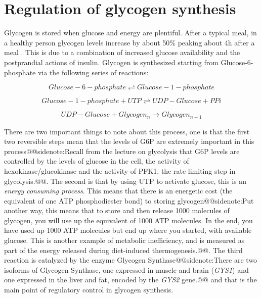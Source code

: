 \documentclass{tufte-handout}
\makeatletter
\def\sidenote#1{@@sidenote:#1@@}
\makeatother
\begin{document}
\section{Regulation of glycogen synthesis}

Glycogen is stored when glucose and energy are plentiful.  After a typical meal, in a healthy person glycogen levels increase by about 50\% peaking about 4h after a meal \citep{Taylor1996a}.  This is due to a combination of increased glucose availability and the postprandial actions of insulin.  Glycogen is synthesized starting from Glucose-6-phosphate via the following series of reactions:

\begin{equation}
Glucose-6-phosphate \rightleftharpoons Glucose-1-phosphate
\end{equation}

\begin{equation}
Glucose-1-phosphate + UTP \rightleftharpoons UDP-Glucose + PPi
\end{equation}

\begin{equation}
UDP-Glucose + Glycogen_n \rightarrow Glycogen_{n+1}
\end{equation}

There are two important things to note about this process, one is that the first two reversible steps mean that the levels of G6P are extremely important in this process\sidenote{Recall from the lecture on glycolysis that G6P levels are controlled by the levels of glucose in the cell, the activity of hexokinase/glucokinase and the activity of PFK1, the rate limiting step in glycolysis.}.  The second is that by using UTP to activate glucose, this is an \emph{energy consuming process}.  This means that there is an energetic cost (the equivalent of one ATP phosphodiester bond) to storing glycogen\sidenote{Put another way, this means that to store and then release 1000 molecules of glycogen, you will use up the equivalent of 1000 ATP molecules.  In the end, you have used up 1000 ATP molecules but end up where you started, with available glucose.  This is another example of metabolic inefficiency, and is measured as part of the energy released during diet-induced thermogenesis.}.  The third reaction is catalyzed by the enzyme Glycogen Synthase\sidenote{There are two isoforms of Glycogen Synthase, one expressed in muscle and brain (\textit{GYS1}) and one expressed in the liver and fat, encoded by the \textit{GYS2} gene.} and that is the main point of regulatory control in glycogen synthesis.
\end{document}
